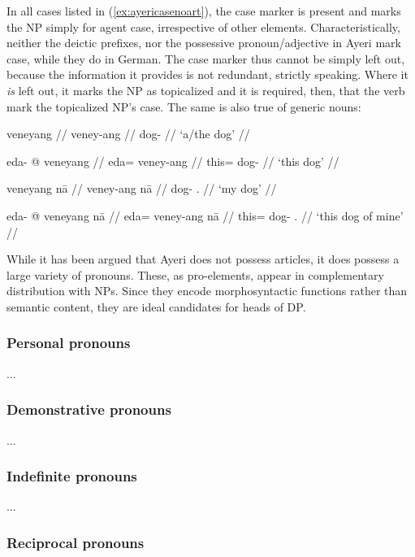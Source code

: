 In all cases listed in (\ref{ex:ayericasenoart}), the case marker is present
and marks the NP simply for agent case, irrespective of other elements.
Characteristically, neither the deictic prefixes, nor the possessive
pronoun/adjective in Ayeri mark case, while they do in German. The case marker
thus cannot be simply left out, because the information it provides is not
redundant, strictly speaking. Where it \emph{is} left out, it marks the NP as
topicalized and it is required, then, that the verb mark the topicalized NP's
case. The same is also true of generic nouns:

\pex
	\a
	\begingl
		\gla veneyang //
		\glb veney-ang //
		\glc dog-\Aarg{} //
		\glft `a/the dog' //
	\endgl

	\a\begingl
		\gla eda- @ veneyang //
		\glb eda= veney-ang //
		\glc this= dog-\Aarg{} //
		\glft `this dog' //
	\endgl

	\a\begingl
		\gla veneyang nā //
		\glb veney-ang nā //
		\glc dog-\Aarg{} \Fsg{}.\Gen{} //
		\glft `my dog' //
	\endgl

	\a\begingl
		\gla eda- @ veneyang nā //
		\glb eda= veney-ang nā //
		\glc this= dog-\Aarg{} \Fsg{}.\Gen{} //
		\glft `this dog of mine' //
	\endgl
\xe

While it has been argued that Ayeri does not possess articles, it does possess 
a large variety of pronouns. These, as pro-elements, appear in complementary
distribution with NPs. Since they encode morphosyntactic functions rather than
semantic content, they are ideal candidates for heads of DP.

\subsubsection{Personal pronouns}

...

\subsubsection{Demonstrative pronouns}

...

\subsubsection{Indefinite pronouns}

...

\subsubsection{Reciprocal pronouns}


